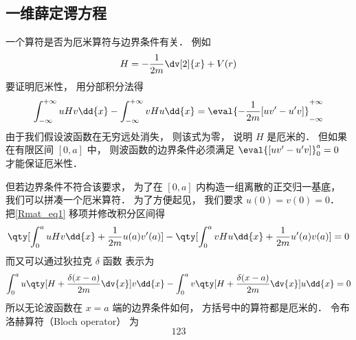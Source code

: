 
\subsection{一维薛定谔方程}
一个算符是否为厄米算符与边界条件有关． 例如
\begin{equation}
H = -\frac{1}{2m}\dv[2]{x} + V(r)
\end{equation}
要证明厄米性， 用分部积分法得
\begin{equation}\label{Rmat_eq1}
\int_{-\infty}^{+\infty} uHv\dd{x} - \int_{-\infty}^{+\infty} vHu\dd{x}
= \eval{-\frac{1}{2m}[uv' - u'v]}_{-\infty}^{+\infty}
\end{equation}
由于我们假设波函数在无穷远处消失， 则该式为零， 说明 $H$ 是厄米的． 但如果在有限区间 $[0, a]$ 中， 则波函数的边界条件必须满足 $\eval{[uv' - u'v]}_{0}^{a} = 0$ 才能保证厄米性．

但若边界条件不符合该要求， 为了在 $[0,a]$ 内构造一组离散的正交归一基底， 我们可以拼凑一个厄米算符． 为了方便起见， 我们要求 $u(0) = v(0) = 0$． 把\autoref{Rmat_eq1} 移项并修改积分区间得
\begin{equation}
\qty[\int_{0}^{a} uHv\dd{x} + \frac{1}{2m}u(a)v'(a)] - \qty[\int_{0}^{a} vHu\dd{x} + \frac{1}{2m}u'(a)v(a)]
= 0
\end{equation}
而又可以通过狄拉克 $\delta$ 函数 表示为
\begin{equation}
\int_{0}^{a} u\qty[H + \frac{\delta(x-a)}{2m}\dv{x}] v\dd{x} -
\int_{0}^{a} v\qty[H + \frac{\delta(x-a)}{2m}\dv{x}] u\dd{x} = 0
\end{equation}
所以无论波函数在 $x=a$ 端的边界条件如何， 方括号中的算符都是厄米的． 令布洛赫算符（Bloch operator） 为
\begin{equation}
123
\end{equation}

